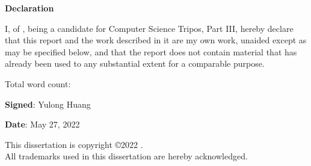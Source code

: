 \newpage
{\Huge \bf Declaration}

\vspace{24pt} 

I, \authorname of \authorcollege , being a candidate for Computer Science Tripos, Part III, hereby declare that this report and the work described in it are my own work, unaided except as may be specified below, and that the report does not contain material that has already been used to any substantial extent for a comparable purpose.

\vspace{24pt}
Total word count: \wordcount

\vspace{60pt}
\textbf{Signed}: Yulong Huang

\vspace{12pt}
\textbf{Date}: May 27, 2022


\vfill

This dissertation is copyright \copyright 2022 \authorname. 
\\
All trademarks used in this dissertation are hereby acknowledged.

\vspace*{\fill}
